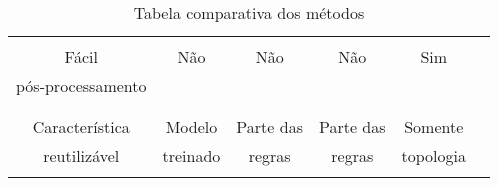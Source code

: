 \begin{table}
\begin{center}
\begin{tabular}{|c|c|c|c|c|c|}
                         &          &           &              &            \\
       \hline
                         &          &           &              &            \\
       Fácil             &   Não    &    Não    &     Não      &    Sim     \\
       pós-processamento &          &           &              &            \\
                         &          &           &              &            \\
       \hline
                         &          &           &              &            \\
       Característica    & Modelo   & Parte das & Parte das    & Somente    \\
       reutilizável      & treinado & regras    & regras       & topologia  \\
                         &          &           &              &            \\
       \hline
     \end{tabular}
   \caption{Tabela comparativa dos métodos}
   \label{table:metodos}
   \end{center}
 \end{table}

